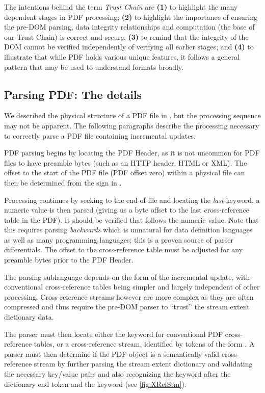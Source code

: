 
The intentions behind the term \emph{Trust Chain} are
%
\textbf{(1)} to highlight the many dependent stages in PDF processing;
%
\textbf{(2)} to highlight the importance of ensuring the pre-DOM
parsing, data integrity relationships and computation (the base of our
Trust Chain) is correct and secure;
%
\textbf{(3)} to remind that the integrity of the DOM cannot be
verified independently of verifying all earlier stages; and
%
\textbf{(4)} to illustrate that while PDF holds various unique
features, it follows a general pattern that may be used to understand
formats broadly.


\subsection{Parsing PDF: The details}
\label{sec:parsingfile}

We described the physical structure of a PDF file in ,
but the processing sequence may not be apparent.
The following paragraphs describe the processing necessary to correctly parse a PDF file containing incremental updates.

PDF parsing begins by locating the PDF Header, as it is not uncommon for PDF files to have 
preamble bytes (such as an HTTP header, HTML or XML). The offset to the start of the PDF file 
(PDF offset zero)
within a physical file can then be determined from the \lstcd{\%} sign in . 

Processing continues by seeking to the end-of-file and 
locating the \emph{last}  keyword,
a numeric value is then parsed (giving us a byte offset 
to the last cross-reference table in the PDF).
It should be verified that  follows the numeric value.
%
Note that this requires parsing \emph{backwards}
which is unnatural for data definition languages as well as many programming
languages;
this is a proven source of parser differentials. 
The offset to the cross-reference table must be adjusted 
for any preamble bytes prior to the PDF Header.

The parsing sublanguage depends on the form of the incremental update, with
conventional cross-reference tables being simpler and largely independent of
other processing. Cross-reference streams however are more complex as they are
often compressed and thus require the pre-DOM parser to ``trust'' the stream
extent dictionary data.

The parser must then locate either the  keyword for
conventional PDF cross-reference tables, or a cross-reference stream, identified by tokens of the form  . 
A parser must then determine if the PDF object is a
semantically valid cross-reference stream by further parsing the stream extent dictionary and 
validating the necessary key/value pairs and also recognizing the  keyword after the dictionary end token \lstcd{>>} and the  keyword (see \cref{fig:XRefStm}). 

